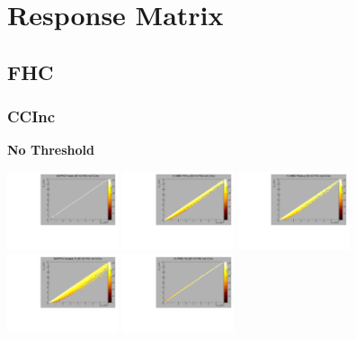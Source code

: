 \section{Response Matrix}

\subsection{FHC}

\subsubsection{CCInc}

\textbf{No Threshold}

\begin{center}

  \includegraphics[width=0.245\textwidth]{plots/response_matrix/Proton_KE_FHC_CCInc_null.pdf}
  \includegraphics[width=0.245\textwidth]{plots/response_matrix/PiPlus_KE_FHC_CCInc_null.pdf}
  \includegraphics[width=0.245\textwidth]{plots/response_matrix/PiMinus_KE_FHC_CCInc_null.pdf}
  \includegraphics[width=0.245\textwidth]{plots/response_matrix/Charged_Pi_KE_FHC_CCInc_null.pdf}
  \includegraphics[width=0.245\textwidth]{plots/response_matrix/Pi0_KE_FHC_CCInc_null.pdf}

\end{center}
